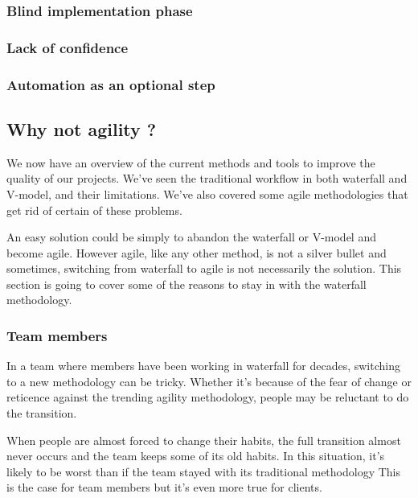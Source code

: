 \subsubsection{Blind implementation phase}

\subsubsection{Lack of confidence}

\subsubsection{Automation as an optional step}

\subsection{Why not agility ?}\label{subsec:why-not-agility}


We now have an overview of the current methods and tools to improve the
quality of our projects.
We've seen the traditional workflow in both waterfall and V-model, and their
limitations.
We've also covered some agile methodologies that get rid of certain of these
problems.

An easy solution could be simply to abandon the waterfall or V-model and become
agile.
However agile, like any other method, is not a silver bullet and sometimes,
switching from waterfall to agile is not necessarily the solution.
This section is going to cover some of the reasons to stay in with the
waterfall methodology.

\subsubsection{Team members}
In a team where members have been working in waterfall for decades, switching
to a new methodology can be tricky.
Whether it's because of the fear of change or reticence against the
trending agility methodology, people may be reluctant to do the transition.

When people are almost forced to change their habits, the full transition
almost never occurs and the team keeps some of its old habits.
In this situation, it's likely to be worst than if the team stayed with its
traditional methodology
This is the case for team members but it's even more true for clients.


